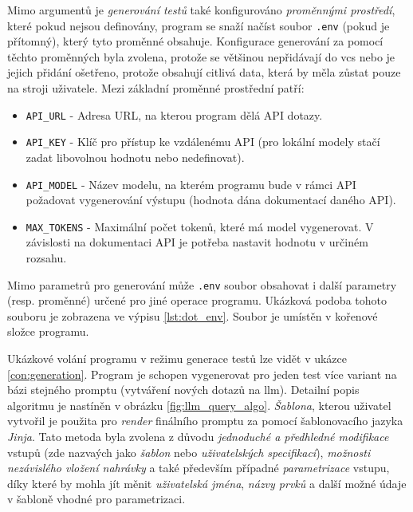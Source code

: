 \documentclass[czech, ma, kiv, he, iso690numb, pdf, viewonly]{fasthesis}
\begin{document}
        Mimo argumentů je \textit{generování testů} také konfigurováno \textit{proměnnými prostředí}, které pokud nejsou definovány, program se snaží načíst soubor \verb|.env| (pokud je přítomný), který tyto proměnné obsahuje. Konfigurace generování za pomocí těchto proměnných byla zvolena, protože se většinou nepřidávají do \Acrshort{vcs} nebo je jejich přidání ošetřeno, protože obsahují citlivá data, která by měla zůstat pouze na stroji uživatele. Mezi základní proměnné prostřední patří:
        \begin{itemize}
            \item \verb|API_URL| - Adresa URL, na kterou program dělá API dotazy.
            \item \verb|API_KEY| - Klíč pro přístup ke vzdálenému API (pro lokální modely stačí zadat libovolnou hodnotu nebo nedefinovat).
            \item \verb|API_MODEL| - Název modelu, na kterém programu bude v rámci API požadovat vygenerování výstupu (hodnota dána dokumentací daného API).
            \item \verb|MAX_TOKENS| - Maximální počet tokenů, které má model vygenerovat. V závislosti na dokumentaci API je potřeba nastavit hodnotu v určiném rozsahu.
        \end{itemize}
        Mimo parametrů pro generování může \verb|.env| soubor obsahovat i další parametry (resp. proměnné) určené pro jiné operace programu. Ukázková podoba tohoto souboru je zobrazena ve výpisu \ref{lst:dot_env}. Soubor je umístěn v kořenové složce programu.

        Ukázkové volání programu v režimu generace testů lze vidět v ukázce \ref{con:generation}. Program je schopen vygenerovat pro jeden test více variant na bázi stejného promptu (vytváření nových dotazů na \Gls{llm}). Detailní popis algoritmu je nastíněn v obrázku \ref{fig:llm_query_algo}. \textit{Šablona}, kterou uživatel vytvořil je použita pro \emph{render} finálního promptu za pomocí šablonovacího jazyka \textit{Jinja}. Tato metoda byla zvolena z důvodu \textit{jednoduché a předhledné modifikace} vstupů (zde nazvaých jako \textit{šablon} nebo \textit{uživatelských specifikací}), \textit{možnosti nezávislého vložení nahrávky} a také především případné \textit{parametrizace} vstupu, díky které by mohla jít měnit \textit{uživatelská jména}, \textit{názvy prvků} a další možné údaje v šabloně vhodné pro parametrizaci. 
\end{document}
